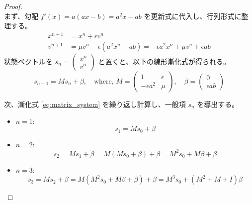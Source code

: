 \documentclass[dvipdfmx,a4paper,11pt]{jsarticle}
\begin{document}
\begin{proof}
 \ \\
\noindent
まず、勾配 $f'(x) = a(ax - b) = a^2 x - ab$ を更新式に代入し、行列形式に整理する。
\begin{align*}
    x^{n+1} &= x^n + \epsilon v^n \\
    v^{n+1} &= \mu v^n - \epsilon (a^2 x^n - ab) = -\epsilon a^2 x^n + \mu v^n + \epsilon ab
\end{align*}
状態ベクトルを $s_n = \begin{pmatrix} x^n \\ v^n \end{pmatrix}$ と置くと、以下の線形漸化式が得られる。
\begin{equation}
    s_{n+1} = M s_n + \beta, \quad \text{where,\  } 
    M = \begin{pmatrix} 1 & \epsilon \\ -\epsilon a^2 & \mu \end{pmatrix}, \quad 
    \beta = \begin{pmatrix} 0 \\ \epsilon ab \end{pmatrix}
    \label{eq:matrix_system}
\end{equation}


次、漸化式 \eqref{eq:matrix_system} を繰り返し計算し、一般項 $s_n$ を導出する。

\begin{itemize}
    \item $n=1$:
    \[ s_1 = M s_0 + \beta \]
    \item $n=2$:
    \[ s_2 = M s_1 + \beta = M(M s_0 + \beta) + \beta = M^2 s_0 + M\beta + \beta \]
    \item $n=3$:
    \[ s_3 = M s_2 + \beta = M(M^2 s_0 + M\beta + \beta) + \beta = M^3 s_0 + (M^2 + M + I)\beta \]
\end{itemize}


\end{proof}
\end{document}
